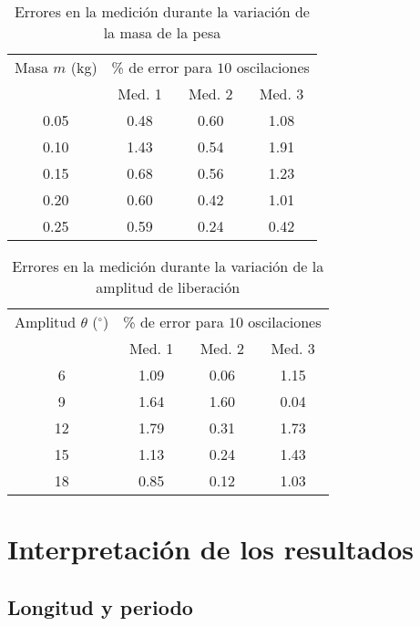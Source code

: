 \documentclass[twocolumn]{report}
\numberwithin{table}{section}
\begin{document}
\begin{table}[ht]
  \centering
  \begin{tabular}{cccc}
    \toprule
    Masa $m$ (kg) & \multicolumn{3}{c}{\% de error para $10$
    oscilaciones} \\
    \cmidrule(lr){2-4}
    & Med. 1 & Med. 2 & Med. 3  \\
    \midrule
    0.05 & 0.48 & 0.60 & 1.08 \\
    0.10 & 1.43 & 0.54 & 1.91 \\
    0.15 & 0.68 & 0.56 & 1.23 \\
    0.20 & 0.60 & 0.42 & 1.01 \\
    0.25 & 0.59 & 0.24 & 0.42 \\
    \bottomrule
  \end{tabular}
  \caption{Errores en la medición durante la variación de la
  masa de la pesa}\label{tab:error_masa}
\end{table}

\begin{table}[ht]
  \centering
  \begin{tabular}{cccc}
    \toprule
    Amplitud $\theta$ ($^{\circ}$) & \multicolumn{3}{c}{\% de
      error para $10$
    oscilaciones} \\
    \cmidrule(lr){2-4}
    & Med. 1 & Med. 2 & Med. 3  \\
    \midrule
    6  & 1.09 & 0.06 & 1.15 \\
    9  & 1.64 & 1.60 & 0.04 \\
    12 & 1.79 & 0.31 & 1.73 \\
    15 & 1.13 & 0.24 & 1.43 \\
    18 & 0.85 & 0.12 & 1.03 \\
    \bottomrule
  \end{tabular}
  \caption{Errores en la medición durante la variación de la
  amplitud de liberación}\label{tab:error_amplitud}
\end{table}

\section{Interpretación de los resultados}
\subsection{Longitud y periodo}
\end{document}
